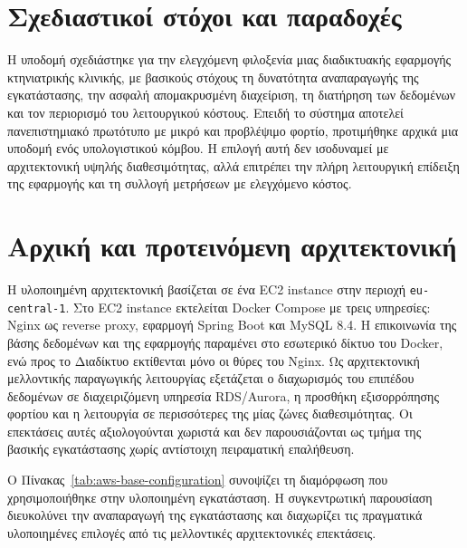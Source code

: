 \section{Σχεδιαστικοί στόχοι και παραδοχές}
Η υποδομή σχεδιάστηκε για την ελεγχόμενη φιλοξενία μιας διαδικτυακής
εφαρμογής κτηνιατρικής κλινικής, με βασικούς στόχους τη δυνατότητα
αναπαραγωγής της εγκατάστασης, την ασφαλή απομακρυσμένη διαχείριση, τη
διατήρηση των δεδομένων και τον περιορισμό του λειτουργικού κόστους. Επειδή
το σύστημα αποτελεί πανεπιστημιακό πρωτότυπο με μικρό και προβλέψιμο φορτίο,
προτιμήθηκε αρχικά μια υποδομή ενός υπολογιστικού κόμβου. Η επιλογή αυτή δεν
ισοδυναμεί με αρχιτεκτονική υψηλής διαθεσιμότητας, αλλά επιτρέπει την πλήρη
λειτουργική επίδειξη της εφαρμογής και τη συλλογή μετρήσεων με ελεγχόμενο
κόστος.
\section{Αρχική και προτεινόμενη αρχιτεκτονική}
Η υλοποιημένη αρχιτεκτονική βασίζεται σε ένα EC2 instance στην περιοχή
\texttt{eu-central-1}. Στο EC2 instance εκτελείται Docker Compose με τρεις
υπηρεσίες: Nginx ως reverse proxy, εφαρμογή Spring Boot
και MySQL 8.4. Η επικοινωνία της βάσης δεδομένων και της εφαρμογής παραμένει
στο εσωτερικό δίκτυο του Docker, ενώ προς το Διαδίκτυο εκτίθενται μόνο οι
θύρες του Nginx. Ως αρχιτεκτονική μελλοντικής παραγωγικής λειτουργίας
εξετάζεται ο διαχωρισμός του επιπέδου δεδομένων σε διαχειριζόμενη υπηρεσία
RDS/Aurora, η προσθήκη εξισορρόπησης φορτίου και η λειτουργία σε περισσότερες
της μίας ζώνες διαθεσιμότητας. Οι επεκτάσεις αυτές αξιολογούνται χωριστά και
δεν παρουσιάζονται ως τμήμα της βασικής εγκατάστασης χωρίς αντίστοιχη
πειραματική επαλήθευση.

Ο Πίνακας~\ref{tab:aws-base-configuration} συνοψίζει τη διαμόρφωση που
χρησιμοποιήθηκε στην υλοποιημένη εγκατάσταση. Η συγκεντρωτική παρουσίαση διευκολύνει
την αναπαραγωγή της εγκατάστασης και διαχωρίζει τις πραγματικά υλοποιημένες
επιλογές από τις μελλοντικές αρχιτεκτονικές επεκτάσεις.

